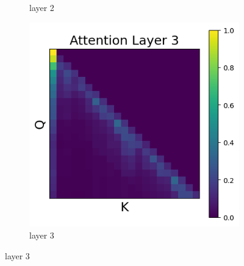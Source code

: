 \documentclass[11pt]{article}
\begin{document}
\begin{figure}[t]
\begin{subfigure}[t]{0.24\textwidth}
    \caption{layer 2}
  \end{subfigure}\hfill
  \begin{subfigure}[t]{0.24\textwidth}
    \centering
    \includegraphics[width=1.4\columnwidth]{figures/intervention5_2/layer_3.png}
    \caption{layer 3}
  \end{subfigure}\hfill


\end{figure}
\end{document}
